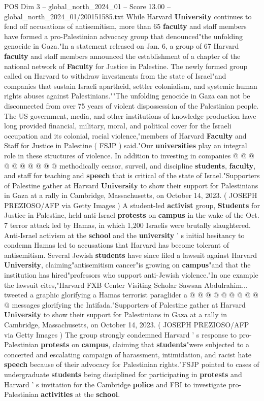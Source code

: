 \begin{textsample}{POS Dim 3 – global\_north\_2024\_01 – Score 13.00 – global\_north\_2024\_01/200151585.txt}  \label{ex:f3_pos_225}
While Harvard \textbf{University} continues to fend off accusations of antisemitism, more than 65 \textbf{faculty} and staff members have formed a pro-Palestinian advocacy group that denounced"the unfolding genocide in Gaza."In a statement released on Jan. 6, a group of 67 Harvard \textbf{faculty} and staff members announced the establishment of a chapter of the national network of \textbf{Faculty} for Justice in Palestine.
The newly formed group called on Harvard to withdraw investments from the state of Israel"and companies that sustain Israeli apartheid, settler colonialism, and systemic human rights abuses against Palestinians.""The unfolding genocide in Gaza can not be disconnected from over 75 years of violent dispossession of the Palestinian people.
The US government, media, and other institutions of knowledge production have long provided financial, military, moral, and political cover for the Israeli occupation and its colonial, racial violence,"members of Harvard \textbf{Faculty} and Staff for Justice in Palestine ( FSJP ) said."Our \textbf{universities} play an integral role in these structures of violence.
In addition to investing in companies @ @ @ @ @ @ @ @ @ @ methodically censor, surveil, and discipline \textbf{students}, \textbf{faculty}, and staff for teaching and \textbf{speech} that is critical of the state of Israel."Supporters of Palestine gather at Harvard \textbf{University} to show their support for Palestinians in Gaza at a rally in Cambridge, Massachusetts, on October 14, 2023. ( JOSEPH PREZIOSO/AFP via Getty Images ) A student-led \textbf{activist} group, \textbf{Students} for Justice in Palestine, held anti-Israel \textbf{protests} on \textbf{campus} in the wake of the Oct. 7 terror attack led by Hamas, in which 1,200 Israelis were brutally slaughtered.
Anti-Israel activism at the \textbf{school} and the \textbf{university} ' s initial hesitancy to condemn Hamas led to accusations that Harvard has become tolerant of antisemitism.
Several Jewish \textbf{students} have since filed a lawsuit against Harvard \textbf{University}, claiming"antisemitism cancer"is growing on \textbf{campus}"and that the institution has hired"professors who support anti-Jewish violence."In one example the lawsuit cites,"Harvard FXB Center Visiting Scholar Sawsan Abdulrahim... tweeted a graphic glorifying a Hamas terrorist paraglider a @ @ @ @ @ @ @ @ @ @ messages glorifying the Intifada."Supporters of Palestine gather at Harvard \textbf{University} to show their support for Palestinians in Gaza at a rally in Cambridge, Massachusetts, on October 14, 2023. ( JOSEPH PREZIOSO/AFP via Getty Images ) The group strongly condemned Harvard ' s response to pro-Palestinian \textbf{protests} on \textbf{campus}, claiming that \textbf{students}"were subjected to a concerted and escalating campaign of harassment, intimidation, and racist hate \textbf{speech} because of their advocacy for Palestinian rights."FSJP pointed to cases of undergraduate \textbf{students} being disciplined for participating in \textbf{protests} and Harvard ' s invitation for the Cambridge \textbf{police} and FBI to investigate pro-Palestinian \textbf{activities} at the \textbf{school}.

\end{textsample}
